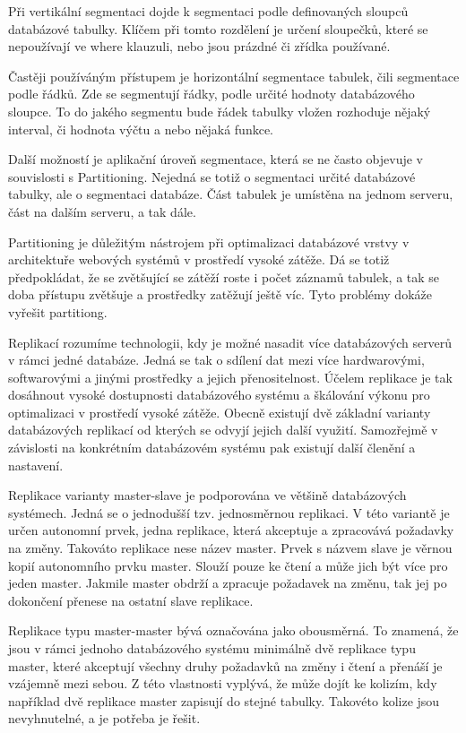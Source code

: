 \documentclass[12pt]{article}
\begin{document}
Při vertikální segmentaci dojde k segmentaci podle definovaných sloupců databázové tabulky. Klíčem při tomto rozdělení je určení sloupečků, které se nepoužívají ve where klauzuli, nebo jsou prázdné či zřídka používané. 

Častěji používáným přístupem je horizontální segmentace tabulek, čili segmentace podle řádků. Zde se segmentují řádky, podle určité hodnoty databázového sloupce. To do jakého segmentu bude řádek tabulky vložen rozhoduje nějaký interval, či hodnota výčtu a nebo nějaká funkce.

Další možností je aplikační úroveň segmentace, která se ne často objevuje v souvislosti s Partitioning. Nejedná se totiž o segmentaci určité databázové tabulky, ale o segmentaci databáze. Část tabulek je umístěna na jednom serveru, část na dalším serveru, a tak dále.

Partitioning je důležitým nástrojem při optimalizaci databázové vrstvy v architektuře webových systémů v prostředí vysoké zátěže. Dá se totiž předpokládat, že se zvětšující se zátěží roste i počet záznamů tabulek, a tak se doba přístupu zvětšuje a prostředky zatěžují ještě víc. Tyto problémy dokáže vyřešit partitiong.
\cite{partitioning-db}

Replikací rozumíme technologii, kdy je možné nasadit více databázových serverů v rámci jedné databáze. Jedná se tak o sdílení dat mezi více hardwarovými, softwarovými a jinými prostředky a jejich přenositelnost. Účelem replikace je tak dosáhnout vysoké dostupnosti databázového systému a škálování výkonu pro optimalizaci v prostředí vysoké zátěže. Obecně existují dvě základní varianty databázových replikací od kterých se odvyjí jejich další využití. Samozřejmě v závislosti na konkrétním databázovém systému pak existují další členění a nastavení. 

Replikace varianty master-slave je podporována ve většině databázových systémech. Jedná se o jednodušší tzv. jednosměrnou replikaci. V této variantě je určen autonomní prvek, jedna replikace, která akceptuje a zpracovává požadavky na změny. Takováto replikace nese název master. Prvek s názvem slave je věrnou kopií autonomního prvku master. Slouží pouze ke čtení a může jich být více pro jeden master. Jakmile master obdrží a zpracuje požadavek na změnu, tak jej po dokončení přenese na ostatní slave replikace.

Replikace typu master-master bývá označována jako obousměrná. To znamená, že jsou v rámci jednoho databázového systému minimálně dvě replikace typu master, které akceptují všechny druhy požadavků na změny i čtení a přenáší je vzájemně mezi sebou. Z této vlastnosti vyplývá, že může dojít ke kolizím, kdy například dvě replikace master zapisují do stejné tabulky. Takovéto kolize jsou nevyhnutelné, a je potřeba je řešit.
\end{document}
